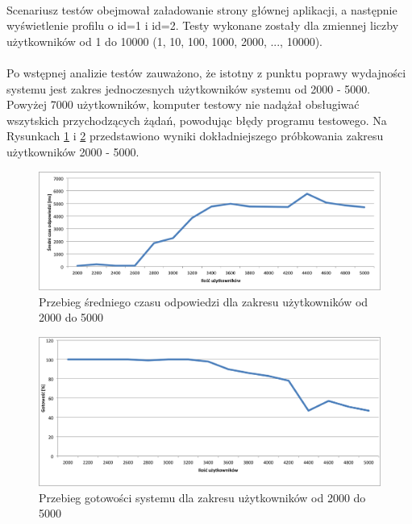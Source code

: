  \paragraph{} %
 \label{par:}
 Scenariusz testów obejmował załadowanie strony głównej aplikacji, a następnie wyświetlenie profilu o id=1 i id=2. Testy wykonane zostały dla zmiennej liczby użytkowników od 1 do 10000 (1, 10, 100, 1000, 2000, ..., 10000). 

\paragraph{} %
\label{par:}
Po wstępnej analizie testów zauważono, że istotny z punktu poprawy wydajności systemu jest zakres jednoczesnych użytkowników systemu od 2000 - 5000. Powyżej 7000 użytkowników, komputer testowy nie nadążał obsługiwać wszytskich przychodzących żądań, powodując błędy programu testowego. Na Rysunkach \ref{fig:sred2} i \ref{fig:got2} przedstawiono wyniki dokładniejszego próbkowania zakresu użytkowników 2000 - 5000.

\begin{figure}[ht]
	\centering
		\includegraphics[width=1\linewidth]{assets/sredni2.png}
		\caption{Przebieg średniego czasu odpowiedzi dla zakresu użytkowników od 2000 do 5000}
	\label{fig:sred2}
\end{figure}

\begin{figure}[ht]
	\centering
		\includegraphics[width=1\linewidth]{assets/gotowosc2.png}
		\caption{Przebieg gotowości systemu dla zakresu użytkowników od 2000 do 5000}
	\label{fig:got2}
\end{figure}

